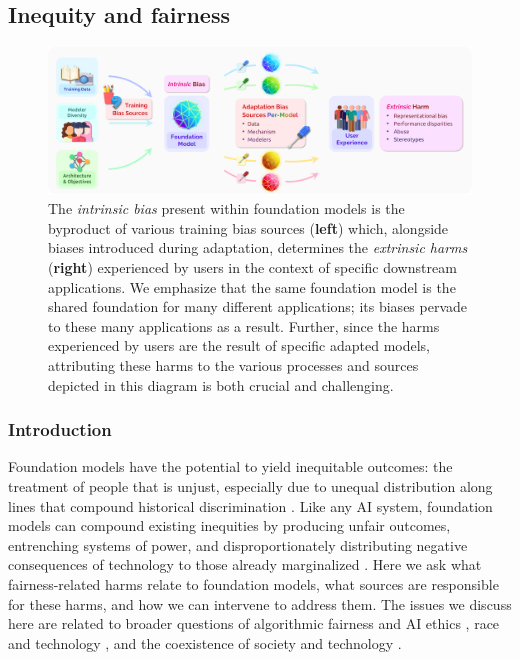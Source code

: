 \newsection
\subsection{Inequity and fairness}
\label{sec:fairness}

\begin{figure}[!ht]
    \centering
    \includegraphics[width=\linewidth]{society/figures/Inequity.png}
    \caption{The \textit{intrinsic bias} present within foundation models is the byproduct of various training bias sources (\textbf{left}) which, alongside biases introduced during adaptation, determines the \textit{extrinsic harms} (\textbf{right}) experienced by users in the context of specific downstream applications. We emphasize that the same foundation model is the shared foundation for many different applications; its biases pervade to these many applications as a result. Further, since the harms experienced by users are the result of specific adapted models, attributing these harms to the various processes and sources depicted in this diagram is both crucial and challenging.}
    \label{fig:fairness}
\end{figure}

\subsubsection{Introduction}
\label{sec:fairness-introduction}
Foundation models have the potential to yield inequitable outcomes: the treatment of people that is unjust, especially due to unequal distribution along lines that compound historical discrimination \citep{Hellman2021Big}. Like any AI system, foundation models can compound existing inequities by producing unfair outcomes, entrenching systems of power, and disproportionately distributing negative consequences of technology to those already marginalized \citep{sweeney2013,kay2015,buolamwini2018gender,benjamin2019,ajunwa2019paradox,datafeminism,crawford2021}. 
Here we ask what fairness-related harms relate to foundation models, what sources are responsible for these harms, and how  we can intervene to address them. 
The issues we discuss here are related to  broader questions of algorithmic fairness and AI ethics \citep{CorbettDavies2018, Chouldechova2020, Hellman2020, Johnson2020, fazelpour2021bias}, race and technology \cite{benjamin2019, Hanna2020, Gebru2021, field2021}, and the coexistence of society and technology \citep{Abebe2020}.

